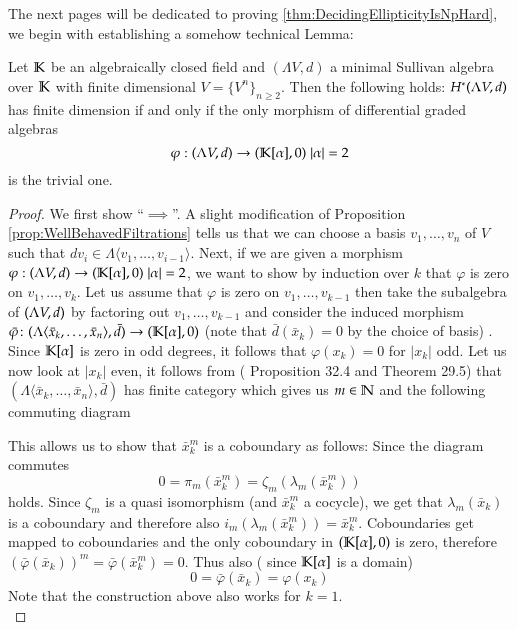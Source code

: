  The next pages will be dedicated to proving \ref{thm:DecidingEllipticityIsNpHard}, we begin with 
 establishing a somehow technical Lemma:
 \begin{Lemma}
 \label{lma:IfAndOnlyIfNonTrivialMorphism}
  Let $\mathbb{K}$ be an algebraically closed field and $(\Lambda V,d)$ a minimal Sullivan
  algebra over $\mathbb{K}$ with finite dimensional $V = {\lbrace V^n \rbrace}_{n \geq 2}$. Then the following holds:\newline
  $H^*(\Lambda V,d)$ has finite dimension if and only if   
  the only morphism of differential graded algebras 
  $$ \varphi : (\Lambda V,d) \to (\mathbb{K}[\alpha],0) \; |\alpha| = 2 $$ 
  is the trivial one.
 \end{Lemma}

 \begin{proof}
 
  
  We first show ``$\implies$''. A slight modification of Proposition \ref{prop:WellBehavedFiltrations} tells us that we can 
  choose a basis $v_1, \ldots , v_n$ of $V$ such that $d v_i \in \Lambda \langle v_1, \ldots, v_{i-1} \rangle$.
  Next, if we are given a morphism  $ \varphi : (\Lambda V,d) \to (\mathbb{K}[\alpha],0) \; |\alpha| = 2 $, we want to show by induction over $k$ that
  $\varphi$ is zero on $v_1 , \ldots, v_k$. Let us assume that $\varphi$ is zero on $v_1, \ldots, v_{k-1}$ then take the
  subalgebra of $(\Lambda V,d)$ by factoring out $v_1, \ldots, v_{k-1}$ and consider the induced morphism 
  $\bar{\varphi} \colon (\Lambda \langle \bar{x}_k, \ldots, \bar{x}_n \rangle , \bar{d}) \to (\mathbb{K}[\alpha],0) $
  (note that $\bar{d}(\bar{x}_k) = 0$ by the  choice of basis) . Since $\mathbb{K}[\alpha]$ is zero in odd degrees,
  it follows that $\varphi(x_k) = 0$ for $|x_k|$ odd. Let us now look at $|x_k|$ even,
  it follows from \cite{Felix2001} ( Proposition 32.4 and Theorem 29.5) that %
  $(\Lambda \langle \bar{x}_k, \ldots, \bar{x}_n \rangle , \bar{d})$ has finite category which gives us  $m \in \mathbb{N}$ and the
  following commuting diagram
  
  \centerline {
  }
  This allows us to show that $\bar{x}_k^m$ is a coboundary as follows:
  Since the diagram commutes 
  $$0 = \pi_m(\bar{x}_k^m) =   \zeta_m (\lambda_m (\bar{x}_k^m))$$ 
  holds. Since $\zeta_m$ is a quasi isomorphism (and $\bar{x}_k^m$ a cocycle), we get that $\lambda_m (\bar{x}_k)$ is a coboundary and
  therefore also $ i_m (\lambda_m (\bar{x}_k^m)) = \bar{x}_k^m$. Coboundaries get mapped to coboundaries and the only coboundary
  in $(\mathbb{K}[\alpha], 0)$ is zero, therefore 
  $(\bar{\varphi}(\bar{x}_k))^m = \bar{\varphi}(\bar{x}_k^m) = 0$. Thus also ( since $\mathbb{K}[\alpha]$ is a domain)
  $$ 0 = \bar{\varphi}(\bar{x}_k) = \varphi( x_k)$$
  Note that the construction above also works for $k = 1$. \\
  

\end{proof}
